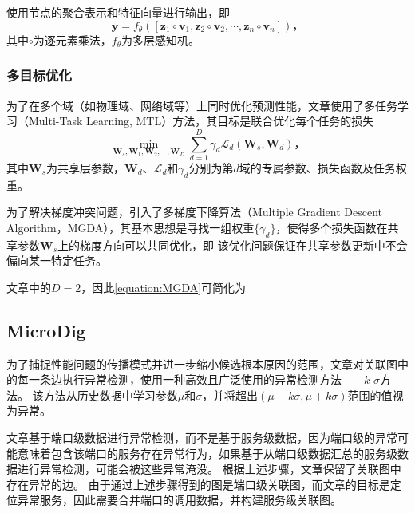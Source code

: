 使用节点的聚合表示和特征向量进行输出，即
\begin{equation*}
    \hat{\bm{y}}=f_\theta([\bm{z}_1\circ\bm{v}_1, \bm{z}_2\circ\bm{v}_2, \cdots, \bm{z}_n\circ\bm{v}_n]) \text{，}
\end{equation*}
其中$\circ$为逐元素乘法，$f_\theta$为多层感知机。


\subsubsection{多目标优化}

为了在多个域（如物理域、网络域等）上同时优化预测性能，文章使用了多任务学习（Multi-Task Learning, MTL）方法，其目标是联合优化每个任务的损失
\begin{equation*}
    \min_{\bm{W}_s,\bm{W}_1,\bm{W}_2,\cdots,\bm{W}_D}\sum_{d=1}^D\gamma_d\mathcal{L}_d(\bm{W}_s,\bm{W}_d) \text{，}
\end{equation*}
其中$\bm{W}_s$为共享层参数，$\bm{W}_d$、$\mathcal{L}_d$和$\gamma_d$分别为第$d$域的专属参数、损失函数及任务权重。

为了解决梯度冲突问题，引入了多梯度下降算法（Multiple Gradient Descent Algorithm，MGDA）\cite{desideri2012multiple}，其基本思想是寻找一组权重$\{\gamma_d\}$，使得多个损失函数在共享参数$\bm{W}_s$上的梯度方向可以共同优化，即
该优化问题保证在共享参数更新中不会偏向某一特定任务。

文章中的$D=2$，因此\cref{equation:MGDA}可简化为

\subsection{MicroDig}

为了捕捉性能问题的传播模式并进一步缩小候选根本原因的范围，文章对关联图中的每一条边执行异常检测，使用一种高效且广泛使用的异常检测方法——$k$-$\sigma$方法。
该方法从历史数据中学习参数$\mu$和$\sigma$，并将超出$(\mu-k\sigma,\mu+k\sigma)$范围的值视为异常。

文章基于端口级数据进行异常检测，而不是基于服务级数据，因为端口级的异常可能意味着包含该端口的服务存在异常行为，如果基于从端口级数据汇总的服务级数据进行异常检测，可能会被这些异常淹没。
根据上述步骤，文章保留了关联图中存在异常的边。
由于通过上述步骤得到的图是端口级关联图，而文章的目标是定位异常服务，因此需要合并端口的调用数据，并构建服务级关联图。

